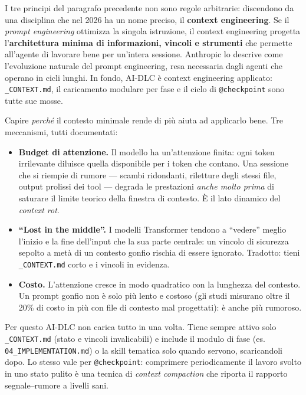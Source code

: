 I tre principi del paragrafo precedente non sono regole arbitrarie: discendono da una disciplina che nel 2026 ha un nome preciso, il \textbf{context engineering}. Se il \textit{prompt engineering} ottimizza la singola istruzione, il context engineering progetta l'\textbf{architettura minima di informazioni, vincoli e strumenti} che permette all'agente di lavorare bene per un'intera sessione. Anthropic lo descrive come l'evoluzione naturale del prompt engineering, resa necessaria dagli agenti che operano in cicli lunghi. In fondo, AI-DLC è context engineering applicato: \texttt{\_CONTEXT.md}, il caricamento modulare per fase e il ciclo di \texttt{@checkpoint} sono tutte sue mosse.

Capire \textit{perché} il contesto minimale rende di più aiuta ad applicarlo bene. Tre meccanismi, tutti documentati:

\begin{itemize}
  \item \textbf{Budget di attenzione.} Il modello ha un'attenzione finita: ogni token irrilevante diluisce quella disponibile per i token che contano. Una sessione che si riempie di rumore --- scambi ridondanti, riletture degli stessi file, output prolissi dei tool --- degrada le prestazioni \textit{anche molto prima} di saturare il limite teorico della finestra di contesto. È il lato dinamico del \textit{context rot}.
  \item \textbf{``Lost in the middle''.} I modelli Transformer tendono a ``vedere'' meglio l'inizio e la fine dell'input che la sua parte centrale: un vincolo di sicurezza sepolto a metà di un contesto gonfio rischia di essere ignorato. Tradotto: tieni \texttt{\_CONTEXT.md} corto e i vincoli in evidenza.
  \item \textbf{Costo.} L'attenzione cresce in modo quadratico con la lunghezza del contesto. Un prompt gonfio non è solo più lento e costoso (gli studi misurano oltre il 20\% di costo in più con file di contesto mal progettati): è anche più rumoroso.
\end{itemize}

Per questo AI-DLC non carica tutto in una volta. Tiene sempre attivo solo \texttt{\_CONTEXT.md} (stato e vincoli invalicabili) e include il modulo di fase (es. \texttt{04\_IMPLEMENTATION.md}) o la skill tematica solo quando servono, scaricandoli dopo. Lo stesso vale per \texttt{@checkpoint}: comprimere periodicamente il lavoro svolto in uno stato pulito è una tecnica di \textit{context compaction} che riporta il rapporto segnale--rumore a livelli sani.

